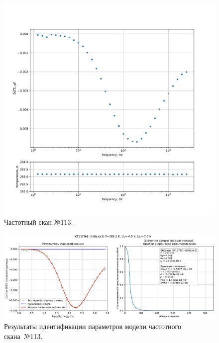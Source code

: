 \begin{figure}[!ht]
    \centering
    \includegraphics[width=1\textwidth]{../plots/КТ117№1_п1(база 2)_2500Гц-1Гц_1пФ_+10С_-4В-7В_100мВ_20мкс_шаг_0,1.pdf}
    \caption{Частотный скан №113.}
    \label{pic:frequency_scan_113}
\end{figure}

\begin{figure}[!ht]
    \centering
    \includegraphics[width=1\textwidth]{../plots/КТ117№1_п1(база 2)_2500Гц-1Гц_1пФ_+10С_-4В-7В_100мВ_20мкс_шаг_0,1_model.pdf}
    \caption{Результаты идентификации параметров модели частотного скана~№113.}
    \label{pic:frequency_scan_model113}
\end{figure}

\pagebreak


